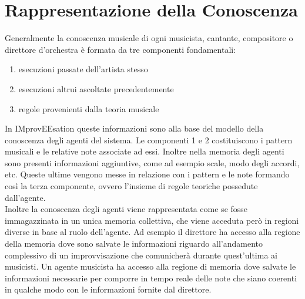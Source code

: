 \section{Rappresentazione della Conoscenza}
Generalmente la conoscenza musicale di ogni musicista, cantante,
compositore o direttore d'orchestra è formata da tre 
componenti fondamentali:
\begin{enumerate}
\item esecuzioni passate dell'artista stesso
\item esecuzioni altrui ascoltate precedentemente
\item regole provenienti dalla teoria musicale
\end{enumerate}

In IMprovEEsation queste informazioni sono alla base del modello della
conoscenza degli agenti del sistema. Le componenti 1 e 2 costituiscono i
pattern musicali e le relative note associate ad essi. Inoltre nella memoria
degli agenti sono presenti informazioni aggiuntive, come ad esempio
scale, modo degli accordi, etc. Queste ultime vengono messe in relazione
con i pattern e le note formando così la terza componente, ovvero l'insieme 
di regole teoriche possedute dall'agente.\\ 
Inoltre la conoscenza degli agenti viene rappresentata come se fosse 
immagazzinata in un unica memoria collettiva, che viene acceduta però in
regioni diverse in base al ruolo dell'agente. Ad esempio il direttore ha
accesso alla regione della memoria dove sono salvate le informazioni
riguardo all'andamento complessivo di un improvvisazione che comunicherà
durante quest'ultima ai musicisti. Un agente musicista ha accesso alla
regione di memoria dove salvate le informazioni necessarie per comporre
in tempo reale delle note che siano coerenti in qualche modo con le
informazioni fornite dal direttore.
